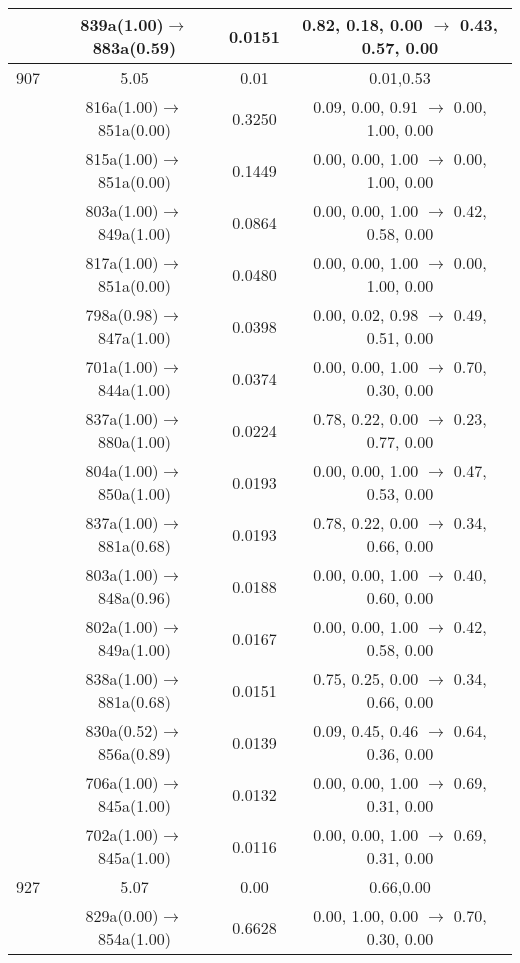 \documentclass[10pt,a4paper]{article}
\begin{document}
\begin{longtable}{c|c|c|c}
 	& 839a(1.00)$\rightarrow$883a(0.59) &	 0.0151 &	 0.82, 0.18, 0.00 $\rightarrow$ 0.43, 0.57, 0.00 \\ 
 \hline907 &	 5.05 &	 0.01 &	 0.01,0.53 \\ 
  	& 816a(1.00)$\rightarrow$851a(0.00) &	 0.3250 &	 0.09, 0.00, 0.91 $\rightarrow$ 0.00, 1.00, 0.00 \\ 
 	& 815a(1.00)$\rightarrow$851a(0.00) &	 0.1449 &	 0.00, 0.00, 1.00 $\rightarrow$ 0.00, 1.00, 0.00 \\ 
 	& 803a(1.00)$\rightarrow$849a(1.00) &	 0.0864 &	 0.00, 0.00, 1.00 $\rightarrow$ 0.42, 0.58, 0.00 \\ 
 	& 817a(1.00)$\rightarrow$851a(0.00) &	 0.0480 &	 0.00, 0.00, 1.00 $\rightarrow$ 0.00, 1.00, 0.00 \\ 
 	& 798a(0.98)$\rightarrow$847a(1.00) &	 0.0398 &	 0.00, 0.02, 0.98 $\rightarrow$ 0.49, 0.51, 0.00 \\ 
 	& 701a(1.00)$\rightarrow$844a(1.00) &	 0.0374 &	 0.00, 0.00, 1.00 $\rightarrow$ 0.70, 0.30, 0.00 \\ 
 	& 837a(1.00)$\rightarrow$880a(1.00) &	 0.0224 &	 0.78, 0.22, 0.00 $\rightarrow$ 0.23, 0.77, 0.00 \\ 
 	& 804a(1.00)$\rightarrow$850a(1.00) &	 0.0193 &	 0.00, 0.00, 1.00 $\rightarrow$ 0.47, 0.53, 0.00 \\ 
 	& 837a(1.00)$\rightarrow$881a(0.68) &	 0.0193 &	 0.78, 0.22, 0.00 $\rightarrow$ 0.34, 0.66, 0.00 \\ 
 	& 803a(1.00)$\rightarrow$848a(0.96) &	 0.0188 &	 0.00, 0.00, 1.00 $\rightarrow$ 0.40, 0.60, 0.00 \\ 
 	& 802a(1.00)$\rightarrow$849a(1.00) &	 0.0167 &	 0.00, 0.00, 1.00 $\rightarrow$ 0.42, 0.58, 0.00 \\ 
 	& 838a(1.00)$\rightarrow$881a(0.68) &	 0.0151 &	 0.75, 0.25, 0.00 $\rightarrow$ 0.34, 0.66, 0.00 \\ 
 	& 830a(0.52)$\rightarrow$856a(0.89) &	 0.0139 &	 0.09, 0.45, 0.46 $\rightarrow$ 0.64, 0.36, 0.00 \\ 
 	& 706a(1.00)$\rightarrow$845a(1.00) &	 0.0132 &	 0.00, 0.00, 1.00 $\rightarrow$ 0.69, 0.31, 0.00 \\ 
 	& 702a(1.00)$\rightarrow$845a(1.00) &	 0.0116 &	 0.00, 0.00, 1.00 $\rightarrow$ 0.69, 0.31, 0.00 \\ 
 \hline927 &	 5.07 &	 0.00 &	 0.66,0.00 \\ 
  	& 829a(0.00)$\rightarrow$854a(1.00) &	 0.6628 &	 0.00, 1.00, 0.00 $\rightarrow$ 0.70, 0.30, 0.00 \\ 

\end{longtable}
\end{document}
